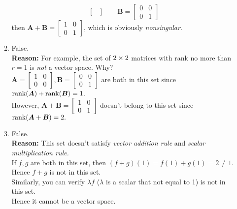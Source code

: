 \begin{enumerate}
\begin{enumerate}
\[\begin{bmatrix}
\end{bmatrix}\qquad\bm B=\begin{bmatrix}
0&0\\0&1
\end{bmatrix}
\]
then $\bm A+\bm B=\begin{bmatrix}
1&0\\0&1
\end{bmatrix}$, which is obviously \textit{nonsingular}.
\item
False.\\
\textbf{Reason: }For example, the set of $2\times 2$ matrices with rank no more than $r=1$ is \emph{not} a vector space. Why?\\
$\bm A=\begin{bmatrix}
1&0\\0&0
\end{bmatrix},\bm B=\begin{bmatrix}
0&0\\0&1
\end{bmatrix}$ are both in this set since $\operatorname{rank}(\bm A)+\operatorname{rank}(\bm B)=1$.\\
However, $\bm A+\bm B=\begin{bmatrix}
1&0\\0&1
\end{bmatrix}$ doesn't belong to this set since $\operatorname{rank}(\bm A+\bm B)=2.$
\item
False.\\
\textbf{Reason: }This set doesn't satisfy \textit{vector addition rule} and \textit{scalar multiplication rule.}\\
If $f,g$ are both in this set, then $(f+g)(1)=f(1)+g(1)=2\ne1.$ Hence $f+g$ is not in this set.\\
Similarly, you can verify $\lambda f$ ($\lambda$ is a scalar that not equal to 1) is not in this set.\\
Hence it cannot be a vector space.
\end{enumerate}
\end{enumerate}